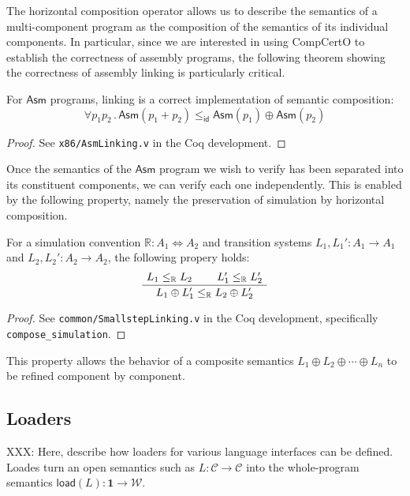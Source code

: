 \documentclass[sigplan,10pt,review,anonymous]{acmart}
\newcommand{\kw}[1]{\ensuremath{ \mathsf{#1} }}
\begin{document}
The horizontal composition operator
allows us to describe the semantics of a
multi-component program
as the composition of the semantics
of its individual components.
In particular,
since we are interested in using CompCertO
to establish the correctness of assembly programs,
the following theorem showing the correctness
of assembly linking is particularly critical.

\begin{theorem} \label{thm:asmlinking} %
For \kw{Asm} programs,
linking is a correct implementation of
semantic composition:
\[
    \forall p_1 p_2 \,.\,
      \kw{Asm}(p_1 + p_2) \le_\kw{id}
      \kw{Asm}(p_1) \oplus \kw{Asm}(p_2)
\]
\begin{proof}
See \texttt{x86/AsmLinking.v} in the Coq development.
\end{proof}
\end{theorem}

Once the semantics of the \kw{Asm} program we wish to verify
has been separated into its constituent components,
we can verify each one independently.
This is enabled by the following property,
namely the preservation of simulation by
horizontal composition.

\begin{theorem} \label{thm:simlinking} %
For a simulation convention
$\mathbb{R} : A_1 \Leftrightarrow A_2$
and transition systems
$L_1, L_1' : A_1 \rightarrow A_1$ and
$L_2, L_2' : A_2 \rightarrow A_2$,
the following propery holds:
\[
    \AxiomC{$L_1 \le_\mathbb{R} L_2$}
    \AxiomC{$L_1' \le_\mathbb{R} L_2'$}
    \BinaryInfC{$L_1 \oplus L_1' \le_\mathbb{R} L_2 \oplus L_2'$}
    \DisplayProof
\]
\begin{proof}
See \texttt{common/SmallstepLinking.v}
in the Coq development,
specifically \texttt{compose\_simulation}.
\end{proof}
\end{theorem}

This property allows the behavior of a composite semantics
$L_1 \oplus L_2 \oplus \cdots \oplus L_n$
to be refined component by component.


\subsection{Loaders} \label{sec:sem:loader} %

XXX: Here, describe how loaders for various language
interfaces can be defined.
Loades turn an open semantics such as
$L : \mathcal{C} \rightarrow \mathcal{C}$
into the whole-program semantics
$\kw{load}(L) : \mathbf{1} \rightarrow \mathcal{W}$.
\end{document}
